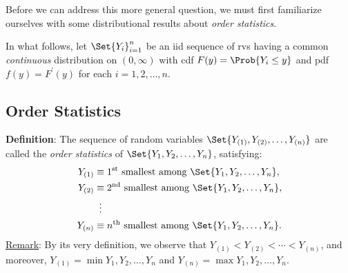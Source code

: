 Before we can address this more general question, we must first familiarize ourselves with
some distributional results about \emph{order statistics}.

In what follows, let $ \Set{Y_i}_{i=1}^n $ be an iid sequence of rvs having a common \emph{continuous} distribution
on $ (0,\infty) $ with cdf $ F(y)=\Prob{Y_i\le y} $ and pdf $ f(y)=F^\prime(y) $ for each $ i=1,2,\ldots,n $.

\subsection*{Order Statistics}
\begin{Regular}
    \textbf{Definition}: The sequence of random variables $ \Set{Y_{(1)},Y_{(2)},\ldots,Y_{(n)}} $ are called the \emph{order statistics}
    of $ \Set{Y_1,Y_2,\ldots,Y_n} $, satisfying:
    \begin{align*}
        Y_{(1)} & \equiv \text{$1\textsuperscript{st}$ smallest among $ \Set{Y_1,Y_2,\ldots,Y_n} $}, \\
        Y_{(2)} & \equiv \text{$2\textsuperscript{nd}$ smallest among $ \Set{Y_1,Y_2,\ldots,Y_n} $}, \\
                & \vdotswithin{\equiv}                                                               \\
        Y_{(n)} & \equiv \text{$n\textsuperscript{th}$ smallest among $ \Set{Y_1,Y_2,\ldots,Y_n} $}.
    \end{align*}
    \tcblower{}
    \underline{Remark}: By its very definition, we observe that $ Y_{(1)}<Y_{(2)}<\cdots<Y_{(n)} $,
    and moreover, $ Y_{(1)}=\min{Y_1,Y_2,\ldots,Y_n} $ and $ Y_{(n)}=\max{Y_1,Y_2,\ldots,Y_n} $.
\end{Regular}
